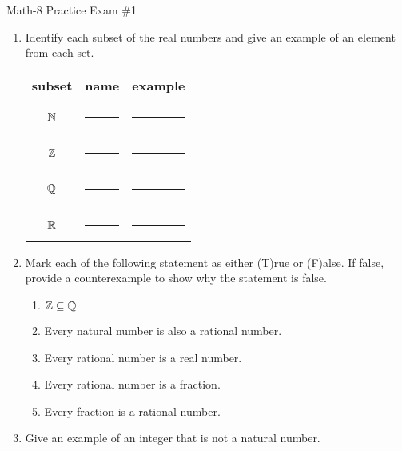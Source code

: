 \documentclass[letterpaper,12pt,fleqn]{article}
\begin{document}
\begin{center}
\Large Math-8 Practice Exam \#1
\end{center}

\newcommand{\fillin}{\rule[-10pt]{2in}{1pt}}
\newcommand{\sfillin}{\rule[-10pt]{0.5in}{1pt}}

\begin{enumerate}
\item Identify each subset of the real numbers and give an example of an
  element from each set.

  \bigskip

\begin{tabular}{ccc}
\textbf{subset} & \textbf{name} & \textbf{example} \\
\\
$\mathbb{N}$ & \fillin & \sfillin \\
\\
$\mathbb{Z}$ & \fillin & \sfillin \\
\\
$\mathbb{Q}$ & \fillin & \sfillin \\
\\
$\mathbb{R}$ & \fillin & \sfillin \\
\end{tabular}

\bigskip

\item Mark each of the following statement as either (T)rue or (F)alse. If
  false, provide a counterexample to show why the statement is false.
  \begin{enumerate}
  \item $\mathbb{Z}\subseteq\mathbb{Q}$
    \vspace{0.25in}
  \item Every natural number is also a rational number.
    \vspace{0.25in}
  \item Every rational number is a real number.
    \vspace{0.25in}
  \item Every rational number is a fraction.
    \vspace{0.25in}
  \item Every fraction is a rational number.
    \vspace{0.25in}
  \end{enumerate}

\item Give an example of an integer that is not a natural number.

  \vspace{0.25in}


\end{enumerate}
\end{document}
